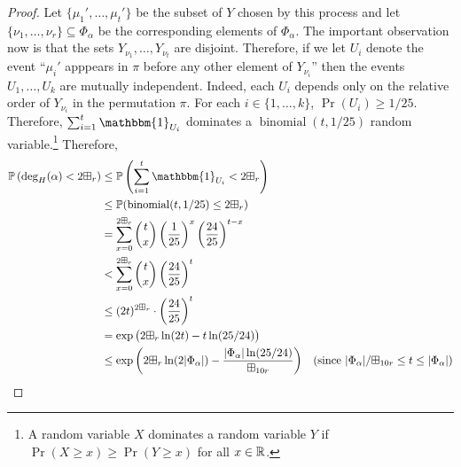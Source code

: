 \documentclass{patmorin}
\newcommand{\vol}[1]{\boxplus_{#1}}
\DeclareMathOperator{\binomial}{binomial}
\begin{document}
\begin{proof}
  Let $\{\mu_1',\ldots,\mu_t'\}$ be the subset of $Y$ chosen by this process and let $\{\nu_1,\ldots,\nu_r\}\subseteq\Phi_\alpha$ be the corresponding elements of $\Phi_\alpha$.  The important observation now is that the sets $Y_{\nu_1},\ldots,Y_{\nu_t}$ are disjoint.  Therefore, if we let $U_i$ denote the event ``$\mu_i'$ apppears in $\pi$ before any other element of $Y_{\nu_i}$'' then the events $U_1,\ldots,U_k$ are mutually independent.  Indeed, each $U_i$ depends only on the relative order of $Y_{\nu_i}$ in the  permutation $\pi$.  For each $i\in\{1,\ldots,k\}$, $\Pr(U_i)\ge 1/25$.  Therefore, $\sum_{i=1}^t \mathbbm{1}_{U_i}$ dominates a $\binomial(t,1/25)$ random variable.\footnote{A random variable $X$ dominates a random variable $Y$ if $\Pr(X\ge x)\ge \Pr(Y\ge x)$ for all $x\in\mathbb{R}$.}  Therefore,
  \begin{align}
    \Pr\left(\deg_H(\alpha)< 2\vol{r}\right)
    & \le \Pr\left(\sum_{i=1}^t \mathbbm{1}_{U_i} < 2\vol{r}\right) \notag \\
    & \le \Pr(\binomial(t,1/25)\le 2\vol{r}) \notag \\
    & = \sum_{x=0}^{2\vol{r}} \binom{t}{x}\left(\frac{1}{25}\right)^x\left(\frac{24}{25}\right)^{t-x} \notag \\
    & < \sum_{x=0}^{2\vol{r}} \binom{t}{x}\left(\frac{24}{25}\right)^{t} \notag \\
    & \le (2t)^{2\vol{r}}\cdot\left(\frac{24}{25}\right)^{t} \notag \\
    & = \exp\big({2\vol{r}}\ln(2t)-t\ln(25/24)\big) \notag \\
    & \le \exp\left({2\vol{r}}\ln(2|\Phi_\alpha|)-\frac{|\Phi_\alpha|\ln(25/24)}{\vol{10r}}\right)
      & \text{(since $|\Phi_\alpha|/\vol{10r} \le t \le |\Phi_\alpha|$)} \label{probability}
  \end{align}



\end{proof}
\end{document}
